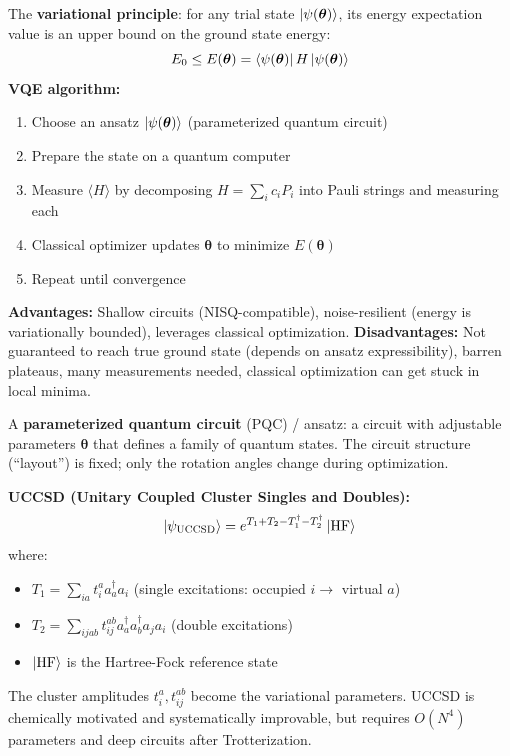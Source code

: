 \documentclass[11pt,a4paper]{article}
\begin{document}
\begin{answerbox}
The \textbf{variational principle}: for any trial state $\ket{\psi(\boldsymbol{\theta})}$, its energy expectation value is an upper bound on the ground state energy:
\[
E_0 \leq E(\boldsymbol{\theta}) = \bra{\psi(\boldsymbol{\theta})} H \ket{\psi(\boldsymbol{\theta})}
\]
\textbf{VQE algorithm:}
\begin{enumerate}
    \item Choose an ansatz $\ket{\psi(\boldsymbol{\theta})}$ (parameterized quantum circuit)
    \item Prepare the state on a quantum computer
    \item Measure $\langle H \rangle$ by decomposing $H = \sum_i c_i P_i$ into Pauli strings and measuring each
    \item Classical optimizer updates $\boldsymbol{\theta}$ to minimize $E(\boldsymbol{\theta})$
    \item Repeat until convergence
\end{enumerate}
\textbf{Advantages:} Shallow circuits (NISQ-compatible), noise-resilient (energy is variationally bounded), leverages classical optimization. \textbf{Disadvantages:} Not guaranteed to reach true ground state (depends on ansatz expressibility), barren plateaus, many measurements needed, classical optimization can get stuck in local minima.
\end{answerbox}

\begin{answerbox}
A \textbf{parameterized quantum circuit} (PQC) / ansatz: a circuit with adjustable parameters $\boldsymbol{\theta}$ that defines a family of quantum states. The circuit structure (``layout'') is fixed; only the rotation angles change during optimization.

\textbf{UCCSD (Unitary Coupled Cluster Singles and Doubles):}
\[
\ket{\psi_{\text{UCCSD}}} = e^{T_1 + T_2 - T_1^\dagger - T_2^\dagger} \ket{\text{HF}}
\]
where:
\begin{itemize}
    \item $T_1 = \sum_{ia} t_i^a a_a^\dagger a_i$ (single excitations: occupied $i \to$ virtual $a$)
    \item $T_2 = \sum_{ijab} t_{ij}^{ab} a_a^\dagger a_b^\dagger a_j a_i$ (double excitations)
    \item $\ket{\text{HF}}$ is the Hartree-Fock reference state
\end{itemize}
The cluster amplitudes $t_i^a, t_{ij}^{ab}$ become the variational parameters. UCCSD is chemically motivated and systematically improvable, but requires $O(N^4)$ parameters and deep circuits after Trotterization.
\end{answerbox}
\end{document}

